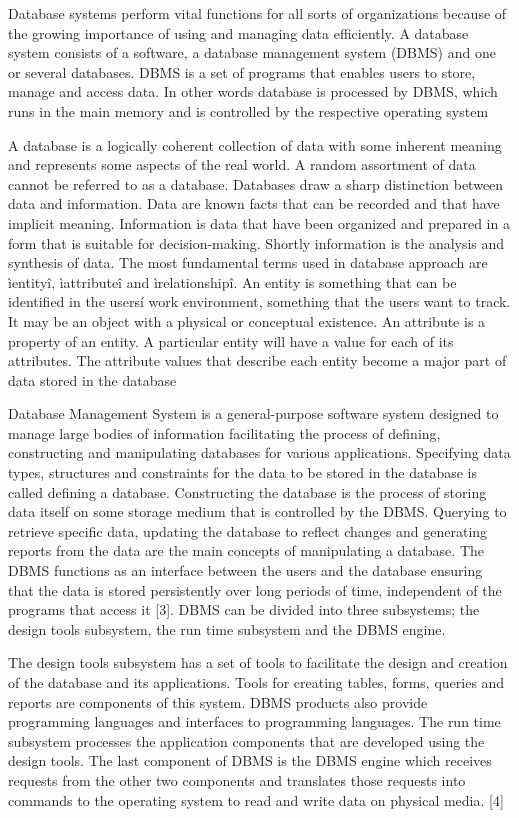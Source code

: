 Database systems perform vital functions for all sorts of organizations
because of the growing importance of using and managing data efficiently. A
database system consists of a software, a database management system (DBMS)
and one or several databases. DBMS is a set of programs that enables users to
store, manage and access data. In other words database is processed by DBMS,
which runs in the main memory and is controlled by the respective operating
system

A database is a logically coherent collection of data with some inherent
meaning and represents some aspects of the real world. A random assortment of
data cannot be referred to as a database. Databases draw a sharp distinction
between data and information. Data are known facts that can be recorded and that
have implicit meaning. Information is data that have been organized and prepared
in a form that is suitable for decision-making. Shortly information is the analysis
and synthesis of data.
The most fundamental terms used in database approach are ìentityî,
ìattributeî and ìrelationshipî. An entity is something that can be identified in the
usersí work environment, something that the users want to track. It may be an
object with a physical or conceptual existence. An attribute is a property of an
entity. A particular entity will have a value for each of its attributes. The attribute
values that describe each entity become a major part of data stored in the database 

Database Management System is a general-purpose software system
designed to manage large bodies of information facilitating the process of
defining, constructing and manipulating databases for various applications.
Specifying data types, structures and constraints for the data to be stored in the
database is called defining a database. Constructing the database is the process of
storing data itself on some storage medium that is controlled by the DBMS.
Querying to retrieve specific data, updating the database to reflect changes and
generating reports from the data are the main concepts of manipulating a database.
The DBMS functions as an interface between the users and the database
ensuring that the data is stored persistently over long periods of time, independent
of the programs that access it [3].
DBMS can be divided into three subsystems; the design tools subsystem,
the run time subsystem and the DBMS engine. 

The design tools subsystem has a set of tools to facilitate the design and
creation of the database and its applications. Tools for creating tables, forms,
queries and reports are components of this system. DBMS products also provide
programming languages and interfaces to programming languages. The run time
subsystem processes the application components that are developed using the
design tools. The last component of DBMS is the DBMS engine which receives
requests from the other two components and translates those requests into
commands to the operating system to read and write data on physical media. [4]

